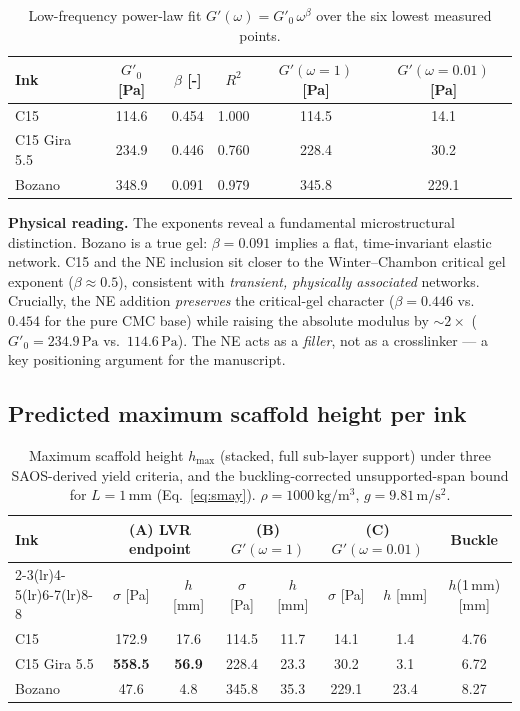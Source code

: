 \documentclass[11pt,a4paper]{article}
\newcommand{\Pa}{\,\mathrm{Pa}}
\begin{document}
\begin{table}[h]
\centering
\small
\caption{Low-frequency power-law fit $G'(\omega) = G'_0\,\omega^{\beta}$ over the
six lowest measured points.}
\label{tab:lowomega_fit}
\begin{tabular}{l c c c c c}
\toprule
Ink & $G'_0$ [Pa] & $\beta$ [-] & $R^2$ & $G'(\omega=1)$ [Pa] & $G'(\omega=0.01)$ [Pa] \\
\midrule
C15            & 114.6 & 0.454 & 1.000 & 114.5 & 14.1 \\
C15 Gira 5.5   & 234.9 & 0.446 & 0.760 & 228.4 & 30.2 \\
Bozano         & 348.9 & 0.091 & 0.979 & 345.8 & 229.1 \\
\bottomrule
\end{tabular}
\end{table}

\noindent\textbf{Physical reading.} The exponents reveal a fundamental
microstructural distinction. Bozano is a true gel: $\beta=0.091$ implies a flat,
time-invariant elastic network. C15 and the NE inclusion sit closer to the
Winter--Chambon critical gel exponent ($\beta\approx 0.5$), consistent with
\emph{transient, physically associated} networks. Crucially, the NE addition
\emph{preserves} the critical-gel character ($\beta=0.446$ vs.~$0.454$ for the
pure CMC base) while raising the absolute modulus by $\sim 2\times$
($G'_0=234.9\Pa$ vs.~$114.6\Pa$). The NE acts as a \emph{filler}, not as a
crosslinker --- a key positioning argument for the manuscript.

\subsection{Predicted maximum scaffold height per ink}

\begin{table}[h]
\centering
\small
\caption{Maximum scaffold height $h_\mathrm{max}$ (stacked, full sub-layer
support) under three SAOS-derived yield criteria, and the buckling-corrected
unsupported-span bound for $L=1\,\mathrm{mm}$ (Eq.~\ref{eq:smay}).
$\rho=1000\,\mathrm{kg/m^3}$, $g=9.81\,\mathrm{m/s^2}$.}
\label{tab:hmax}
\begin{tabular}{l c c c c c c c}
\toprule
\multirow{2}{*}{Ink}
 & \multicolumn{2}{c}{(A) LVR endpoint}
 & \multicolumn{2}{c}{(B) $G'(\omega=1)$}
 & \multicolumn{2}{c}{(C) $G'(\omega=0.01)$}
 & Buckle \\
\cmidrule(lr){2-3}\cmidrule(lr){4-5}\cmidrule(lr){6-7}\cmidrule(lr){8-8}
 & $\sigma$ [Pa] & $h$ [mm] & $\sigma$ [Pa] & $h$ [mm] & $\sigma$ [Pa] & $h$ [mm] & $h$(1\,mm)[mm] \\
\midrule
C15           & 172.9 & 17.6 & 114.5 & 11.7 & 14.1  & 1.4  & 4.76 \\
C15 Gira 5.5  & \textbf{558.5} & \textbf{56.9} & 228.4 & 23.3 & 30.2  & 3.1  & 6.72 \\
Bozano        & 47.6  & 4.8  & 345.8 & 35.3 & 229.1 & 23.4 & 8.27 \\
\bottomrule
\end{tabular}
\end{table}
\end{document}
